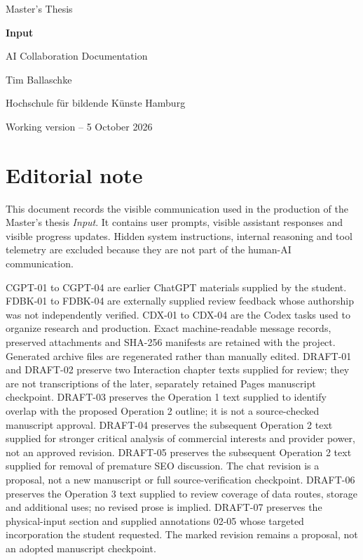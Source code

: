 \documentclass[10pt,a4paper]{article}
\begin{document}
\hypersetup{pageanchor=false}
\begin{titlepage}
  \centering
  \vspace*{0.2\textheight}
  {\Large Master's Thesis\par}
  \vspace{1cm}
  {\Huge\bfseries Input\par}
  \vspace{1.5cm}
  {\LARGE AI Collaboration Documentation\par}
  \vspace{1cm}
  {\large Tim Ballaschke\par}
  \vfill
  {\large Hochschule für bildende Künste Hamburg\par}
  \vspace{0.5cm}
  {\small Working version -- 5 October 2026\par}
\end{titlepage}
\hypersetup{pageanchor=true}

\section*{Editorial note}

This document records the visible communication used in the production of the
Master's thesis \emph{Input}. It contains user prompts, visible assistant responses and
visible progress updates. Hidden system instructions, internal reasoning and tool
telemetry are excluded because they are not part of the human-AI communication.

CGPT-01 to CGPT-04 are earlier ChatGPT materials supplied by the student. FDBK-01
to FDBK-04 are externally supplied review feedback whose authorship was not
independently verified. CDX-01 to CDX-04 are the Codex tasks used to organize
research and production. Exact machine-readable message records, preserved
attachments and SHA-256 manifests are retained with the project. Generated
archive files are regenerated rather than manually edited. DRAFT-01 and
DRAFT-02 preserve two Interaction chapter texts supplied for review; they are not
transcriptions of the later, separately retained Pages manuscript checkpoint.
DRAFT-03 preserves the Operation 1 text supplied to identify overlap with the
proposed Operation 2 outline; it is not a source-checked manuscript approval.
DRAFT-04 preserves the subsequent Operation 2 text supplied for stronger critical
analysis of commercial interests and provider power, not an approved revision.
DRAFT-05 preserves the subsequent Operation 2 text supplied for removal of
premature SEO discussion. The chat revision is a proposal, not a new manuscript
or full source-verification checkpoint.
DRAFT-06 preserves the Operation 3 text supplied to review coverage of data
routes, storage and additional uses; no revised prose is implied.
DRAFT-07 preserves the physical-input section and supplied annotations 02-05
whose targeted incorporation the student requested. The marked revision remains
a proposal, not an adopted manuscript checkpoint.
\end{document}
